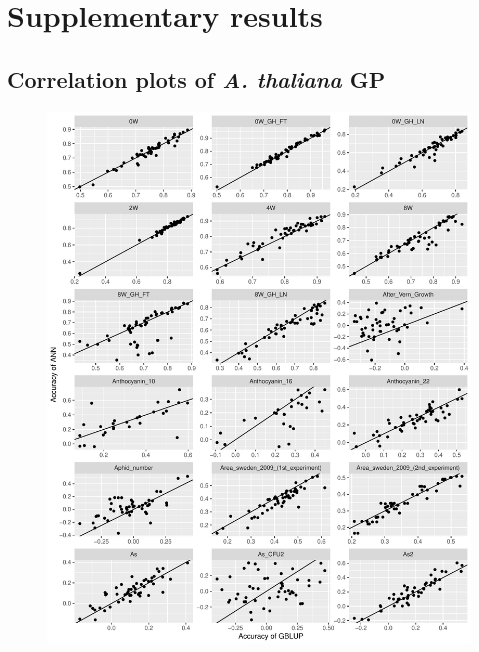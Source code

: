 
\chapter{Supplementary results} %

\label{AppendixD} %

\section{Correlation plots of \textit{A. thaliana} GP}  \label{AC:gp_res}
  
\begin{figure}[H]
  \centering \includegraphics[height=1.05\textheight, width=1.1\textwidth]{Figures/cor_plots_0}
  \decoRule
 \label{fig:bla}
\end{figure}


